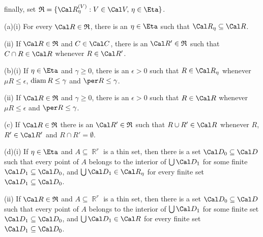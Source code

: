 
\noindent
finally, set $\frak R=\{\Cal R^{(V)}_{\eta}:V\in\Cal V,\,\eta\in\Eta\}$.

 (a)(i) For every $\Cal R\in\frak R$, there is an
$\eta\in\Eta$ such that $\Cal R_{\eta}\subseteq\Cal R$.

\quad(ii) If $\Cal R\in\frak R$ and $C\in\Cal C$, there is an
$\Cal R'\in\frak R$ such that $C\cap R\in\Cal R$ whenever $R\in\Cal R'$.

(b)(i) If $\eta\in\Eta$ and $\gamma\ge 0$, there is an $\epsilon>0$ such
that $R\in\Cal R_{\eta}$ whenever $\mu R\le\epsilon$, $\mathop{\text{diam}} R\le\gamma$
and $\per R\le\gamma$.

\quad(ii) If $\Cal R\in\frak R$ and $\gamma\ge 0$, there is an
$\epsilon>0$ such that $R\in\Cal R$ whenever $\mu R\le\epsilon$
and $\per R\le\gamma$.

(c) If $\Cal R\in\frak R$ there is an $\Cal R'\in\frak R$ such that
$R\cup R'\in\Cal R$ whenever $R$, $R'\in\Cal R'$ and
$R\cap R'=\emptyset$.

(d)(i) If $\eta\in\Eta$ and $A\subseteq\BbbR^r$ is a thin set, then
there is a set $\Cal D_0\subseteq\Cal D$ such that every point of $A$
belongs to the interior of $\bigcup\Cal D_1$ for some finite
$\Cal D_1\subseteq\Cal D_0$, and $\bigcup\Cal D_1\in\Cal R_{\eta}$ for
every finite set $\Cal D_1\subseteq\Cal D_0$.

\quad(ii) If $\Cal R\in\frak R$ and $A\subseteq\BbbR^r$ is a thin
set, then there is a set $\Cal D_0\subseteq\Cal D$ such that every point
of $A$ belongs to the interior of $\bigcup\Cal D_1$ for some finite set
$\Cal D_1\subseteq\Cal D_0$, and $\bigcup\Cal D_1\in\Cal R$ for every
finite set $\Cal D_1\subseteq\Cal D_0$.

